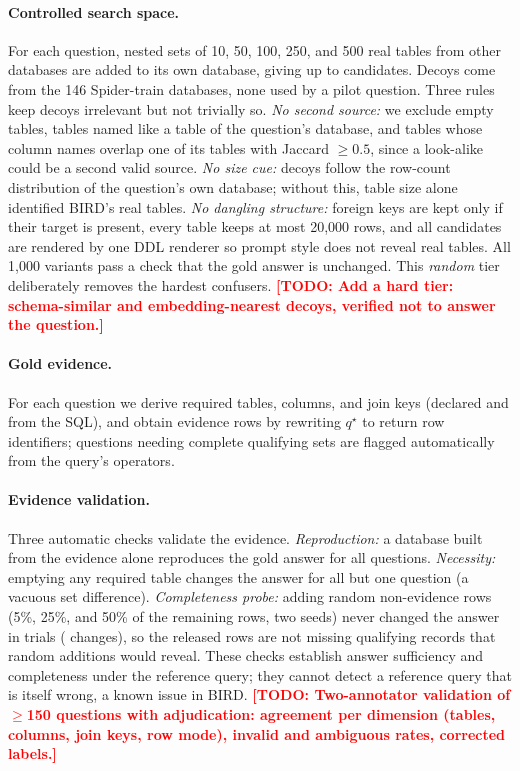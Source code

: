 \documentclass[11pt]{article}
\newif\ifdraft \drafttrue   %
\newcommand{\todo}[1]{\ifdraft\textcolor{red}{\textbf{[TODO: #1]}}\fi}
\begin{document}
\paragraph{Controlled search space.} For each question, nested sets of 10, 50, 100, 250, and 500 real tables from other databases are added to its own database, giving up to \nCandTopMax{} candidates. Decoys come from the 146 Spider-train databases, none used by a pilot question. Three rules keep decoys irrelevant but not trivially so. \emph{No second source:} we exclude empty tables, tables named like a table of the question's database, and tables whose column names overlap one of its tables with Jaccard $\ge0.5$, since a look-alike could be a second valid source. \emph{No size cue:} decoys follow the row-count distribution of the question's own database; without this, table size alone identified BIRD's real tables. \emph{No dangling structure:} foreign keys are kept only if their target is present, every table keeps at most 20{,}000 rows, and all candidates are rendered by one DDL renderer so prompt style does not reveal real tables. All 1{,}000 variants pass a check that the gold answer is unchanged. This \emph{random} tier deliberately removes the hardest confusers. \todo{Add a hard tier: schema-similar and embedding-nearest decoys, verified not to answer the question.}

\paragraph{Gold evidence.} For each question we derive required tables, columns, and join keys (declared and from the SQL), and obtain evidence rows by rewriting $q^\star$ to return row identifiers; questions needing complete qualifying sets are flagged automatically from the query's operators.

\paragraph{Evidence validation.} Three automatic checks validate the evidence. \emph{Reproduction:} a database built from the evidence alone reproduces the gold answer for all \nQuestions{} questions. \emph{Necessity:} emptying any required table changes the answer for all but one question (a vacuous set difference). \emph{Completeness probe:} adding random non-evidence rows (5\%, 25\%, and 50\% of the remaining rows, two seeds) never changed the answer in \nProbeTrials{} trials (\nProbeChanged{} changes), so the released rows are not missing qualifying records that random additions would reveal. These checks establish answer sufficiency and completeness under the reference query; they cannot detect a reference query that is itself wrong, a known issue in BIRD. \todo{Two-annotator validation of $\ge$150 questions with adjudication: agreement per dimension (tables, columns, join keys, row mode), invalid and ambiguous rates, corrected labels.}
\end{document}
